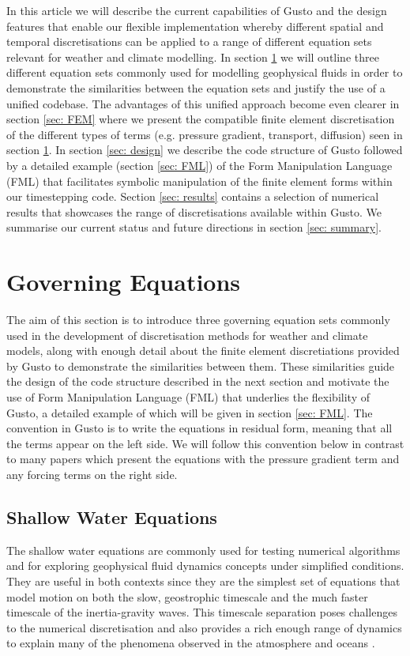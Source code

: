 \documentclass[journal abbreviation, manuscript]{copernicus}
\begin{document}
In this article we will describe the current capabilities of Gusto and
the design features that enable our flexible implementation whereby
different spatial and temporal discretisations can be applied to a
range of different equation sets relevant for weather and climate
modelling. In section \ref{sec: governing} we will outline three
different equation sets commonly used for modelling geophysical fluids
in order to demonstrate the similarities between the equation sets and
justify the use of a unified codebase. The advantages of this unified
approach become even clearer in section \ref{sec: FEM} where we
present the compatible finite element discretisation of the different
types of terms (e.g. pressure gradient, transport, diffusion) seen in
section \ref{sec: governing}. In section \ref{sec: design} we describe
the code structure of Gusto followed by a detailed example (section
\ref{sec: FML}) of the Form Manipulation Language (FML) that
facilitates symbolic manipulation of the finite element forms within
our timestepping code. Section \ref{sec: results} contains a selection
of numerical results that showcases the range of discretisations
available within Gusto. We summarise our current status and future
directions in section \ref{sec: summary}.

\section{Governing Equations}
\label{sec: governing}
The aim of this section is to introduce three governing equation sets
commonly used in the development of discretisation methods for weather
and climate models, along with enough detail about the finite element
discretiations provided by Gusto to demonstrate the similarities
between them. These similarities guide the design of the code
structure described in the next section and motivate the use of Form
Manipulation Language (FML) that underlies the flexibility of Gusto, a
detailed example of which will be given in section \ref{sec: FML}. The
convention in Gusto is to write the equations in residual form,
meaning that all the terms appear on the left side. We will follow
this convention below in contrast to many papers which present the
equations with the pressure gradient term and any forcing terms on the
right side.

\subsection{Shallow Water Equations}
The shallow water equations are commonly used for testing numerical
algorithms and for exploring geophysical fluid dynamics concepts under
simplified conditions. They are useful in both contexts since they are
the simplest set of equations that model motion on both the slow,
geostrophic timescale and the much faster timescale of the
inertia-gravity waves. This timescale separation poses challenges to
the numerical discretisation and also provides a rich enough range of
dynamics to explain many of the phenomena observed in the atmosphere
and oceans \citep{zeitlin2018geophysical}.
\end{document}
